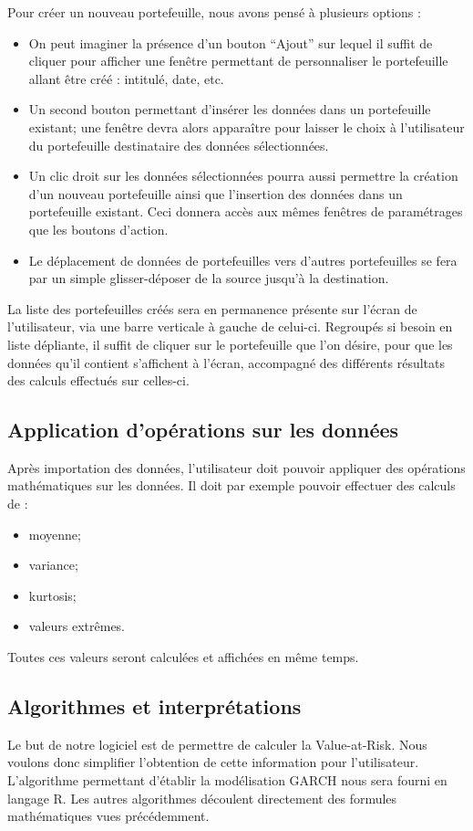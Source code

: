 		Pour créer un nouveau portefeuille, nous avons pensé à plusieurs options :
		\begin{itemize}
			\item On peut imaginer la présence d'un bouton “Ajout” sur lequel il suffit de cliquer pour afficher une fenêtre permettant de personnaliser le portefeuille allant être créé : intitulé, date, etc.
			\item Un second bouton permettant d'insérer les données dans un portefeuille existant; une fenêtre devra alors apparaître pour laisser le choix à l'utilisateur du portefeuille destinataire des données sélectionnées.
			\item Un clic droit sur les données sélectionnées pourra aussi permettre la création d'un nouveau portefeuille ainsi que l'insertion des données dans un portefeuille existant. Ceci donnera accès aux mêmes fenêtres de paramétrages que les boutons d'action.
			\item Le déplacement de données de portefeuilles vers d'autres portefeuilles se fera par un simple glisser-déposer de la source jusqu'à la destination. 
		\end{itemize}

		La liste des portefeuilles créés sera en permanence présente sur l'écran de l'utilisateur, via une barre verticale à gauche de celui-ci.
		Regroupés si besoin en liste dépliante, il suffit de cliquer sur le portefeuille que l'on désire, pour que les données qu'il contient s'affichent à l'écran, accompagné des différents résultats des calculs effectués sur celles-ci. 



	\subsection{Application d'opérations sur les données}
		Après importation des données, l'utilisateur doit pouvoir appliquer des opérations mathématiques sur les données.
		Il doit par exemple pouvoir effectuer des calculs de :
		\begin{itemize}
			\item moyenne;
			\item variance;
			\item kurtosis;
			\item valeurs extrêmes.
		\end{itemize}
		Toutes ces valeurs seront calculées et affichées en même temps.


	\subsection{Algorithmes et interprétations}
		Le but de notre logiciel est de permettre de calculer la Value-at-Risk. Nous voulons donc simplifier l'obtention de cette information pour l'utilisateur. L'algorithme permettant d'établir la modélisation GARCH nous sera fourni en langage R. Les autres algorithmes découlent directement des formules mathématiques vues précédemment.

